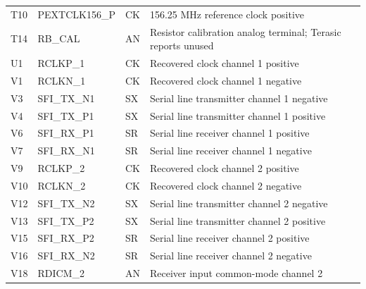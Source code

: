 \documentclass[10pt,a4paper]{article}
\begin{document}
\begin{longtable}{@{}p{12mm}p{44mm}p{10mm}p{91mm}@{}}
T10 & PEXTCLK156\_P & CK & 156.25 MHz reference clock positive\\
T14 & RB\_CAL & AN & Resistor calibration analog terminal; Terasic reports unused\\
U1 & RCLKP\_1 & CK & Recovered clock channel 1 positive\\
V1 & RCLKN\_1 & CK & Recovered clock channel 1 negative\\
V3 & SFI\_TX\_N1 & SX & Serial line transmitter channel 1 negative\\
V4 & SFI\_TX\_P1 & SX & Serial line transmitter channel 1 positive\\
V6 & SFI\_RX\_P1 & SR & Serial line receiver channel 1 positive\\
V7 & SFI\_RX\_N1 & SR & Serial line receiver channel 1 negative\\
V9 & RCLKP\_2 & CK & Recovered clock channel 2 positive\\
V10 & RCLKN\_2 & CK & Recovered clock channel 2 negative\\
V12 & SFI\_TX\_N2 & SX & Serial line transmitter channel 2 negative\\
V13 & SFI\_TX\_P2 & SX & Serial line transmitter channel 2 positive\\
V15 & SFI\_RX\_P2 & SR & Serial line receiver channel 2 positive\\
V16 & SFI\_RX\_N2 & SR & Serial line receiver channel 2 negative\\
V18 & RDICM\_2 & AN & Receiver input common-mode channel 2\\
\bottomrule\end{longtable}
\normalsize
\end{document}

